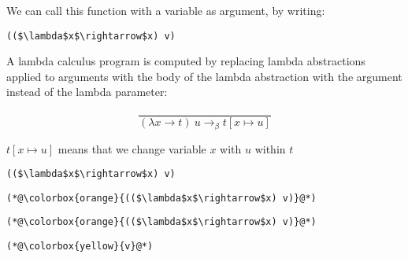 \documentclass{beamer}
\begin{document}
\begin{frame}[fragile]{\CurrentSection}
\begin{exampleblock}{}
We can call this function with a variable as argument, by writing:
\end{exampleblock}

 
\lstset{basicstyle=\ttfamily\small}\lstset{numbers=none}\lstset{language=ML}\begin{lstlisting}
(($\lambda$x$\rightarrow$x) v)
\end{lstlisting}
 

\end{frame}

\begin{frame}[fragile]{\CurrentSection}
\begin{exampleblock}{}
A lambda calculus program is computed by replacing lambda abstractions applied to arguments with the body of the lambda abstraction with the argument instead of the lambda parameter:
\end{exampleblock}

 
\pause 
$$\frac{}{(\lambda x \rightarrow t)\ u  \rightarrow_\beta t [ x \mapsto u ]}$$
 
\begin{exampleblock}{}
$t [ x \mapsto u ]$ means that we change variable $x$ with $u$ within $t$
\end{exampleblock}

 

\end{frame}

\begin{frame}[fragile]{\CurrentSection}
\lstset{basicstyle=\ttfamily\small}\lstset{numbers=none}\lstset{language=ML}\begin{lstlisting}
(($\lambda$x$\rightarrow$x) v)
\end{lstlisting}
\pause\lstset{language=ML}\begin{lstlisting}
(*@\colorbox{orange}{(($\lambda$x$\rightarrow$x) v)}@*)
\end{lstlisting}

\end{frame}

\begin{frame}[fragile]{\CurrentSection}
\lstset{basicstyle=\ttfamily\small}\lstset{numbers=none}\lstset{language=ML}\begin{lstlisting}
(*@\colorbox{orange}{(($\lambda$x$\rightarrow$x) v)}@*)
\end{lstlisting}
\pause\lstset{language=ML}\begin{lstlisting}
(*@\colorbox{yellow}{v}@*)
\end{lstlisting}

\end{frame}
\end{document}
